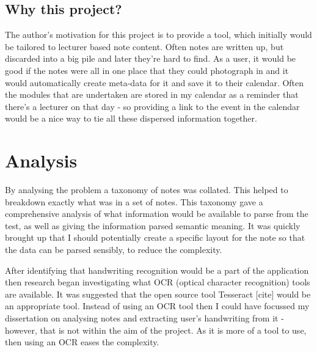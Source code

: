 \subsection{Why this project?}
The author's motivation for this project is to provide a tool, which initially would be tailored to lecturer based note content. Often notes are written up, but discarded into a big pile and later they're hard to find. As a user, it would be good if the notes were all in one place that they could photograph in and it would automatically create meta-data for it and save it to their calendar. Often the modules that are undertaken are stored in my calendar as a reminder that there's a lecturer on that day - so providing a link to the event in the calendar would be a nice way to tie all these dispersed information together.

\section{Analysis}


By analysing the problem a taxonomy of notes was collated. This helped to breakdown exactly what was in a set of notes. This taxonomy gave a comprehensive analysis of what information would be available to parse from the test, as well as giving the information parsed semantic meaning. It was quickly brought up that I should potentially create a specific layout for the note so that the data can be parsed sensibly, to reduce the complexity.

After identifying that handwriting recognition would be a part of the application then research began investigating what OCR (optical character recognition) tools are available. It was suggested that the open source tool Tesseract [cite] would be an appropriate tool. Instead of using an OCR tool then I could have focussed my dissertation on analysing notes and extracting user's handwriting from it - however, that is not within the aim of the project. As it is more of a tool to use, then using an OCR eases the complexity.

